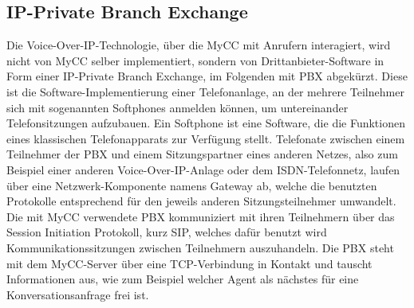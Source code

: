 \subsection{IP-Private Branch Exchange}
\label{subsec:IP-Private Branch Exchange}
Die Voice-Over-IP-Technologie, über die MyCC mit Anrufern interagiert, wird nicht von MyCC selber implementiert, sondern von Drittanbieter-Software in Form einer IP-Private Branch Exchange, im Folgenden mit PBX abgekürzt. Diese ist die Software-Implementierung einer Telefonanlage, an der mehrere Teilnehmer sich mit sogenannten Softphones anmelden können, um untereinander Telefonsitzungen aufzubauen. Ein Softphone ist eine Software, die die Funktionen eines klassischen Telefonapparats zur Verfügung stellt. Telefonate zwischen einem Teilnehmer der PBX und einem Sitzungspartner eines anderen Netzes, also zum Beispiel einer anderen Voice-Over-IP-Anlage oder dem ISDN-Telefonnetz, laufen über eine Netzwerk-Komponente namens Gateway ab, welche die benutzten Protokolle entsprechend für den jeweils anderen Sitzungsteilnehmer umwandelt. Die mit MyCC verwendete PBX kommuniziert mit ihren Teilnehmern über das Session Initiation Protokoll, kurz SIP, welches dafür benutzt wird Kommunikationssitzungen zwischen Teilnehmern auszuhandeln. Die PBX steht mit dem MyCC-Server über eine TCP-Verbindung in Kontakt und tauscht Informationen aus, wie zum Beispiel welcher Agent als nächstes für eine Konversationsanfrage frei ist. 


